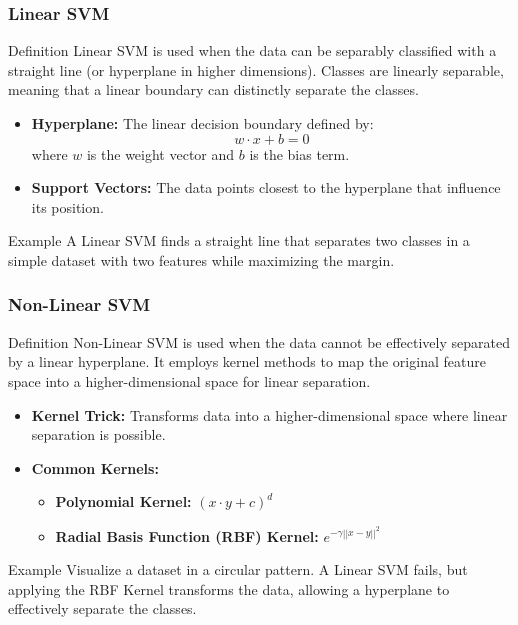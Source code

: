 \documentclass{beamer}
\begin{document}
\begin{frame}[fragile]
    \frametitle{Linear SVM}
    \begin{block}{Definition}
        Linear SVM is used when the data can be separably classified with a straight line (or hyperplane in higher dimensions). 
        Classes are linearly separable, meaning that a linear boundary can distinctly separate the classes.
    \end{block}
    \begin{itemize}
        \item \textbf{Hyperplane:} The linear decision boundary defined by:
        \begin{equation}
            w \cdot x + b = 0
        \end{equation}
        where \(w\) is the weight vector and \(b\) is the bias term.
        
        \item \textbf{Support Vectors:} The data points closest to the hyperplane that influence its position.
    \end{itemize}
    \begin{block}{Example}
        A Linear SVM finds a straight line that separates two classes in a simple dataset with two features while maximizing the margin.
    \end{block}
\end{frame}

\begin{frame}[fragile]
    \frametitle{Non-Linear SVM}
    \begin{block}{Definition}
        Non-Linear SVM is used when the data cannot be effectively separated by a linear hyperplane. 
        It employs kernel methods to map the original feature space into a higher-dimensional space for linear separation.
    \end{block}
    \begin{itemize}
        \item \textbf{Kernel Trick:} Transforms data into a higher-dimensional space where linear separation is possible.
        
        \item \textbf{Common Kernels:}
        \begin{itemize}
            \item \textbf{Polynomial Kernel:} \((x \cdot y + c)^d\)
            \item \textbf{Radial Basis Function (RBF) Kernel:} \(e^{-\gamma ||x - y||^2}\)
        \end{itemize}
    \end{itemize}
    \begin{block}{Example}
        Visualize a dataset in a circular pattern. A Linear SVM fails, but applying the RBF Kernel transforms the data, allowing a hyperplane to effectively separate the classes.
    \end{block}
\end{frame}
\end{document}
